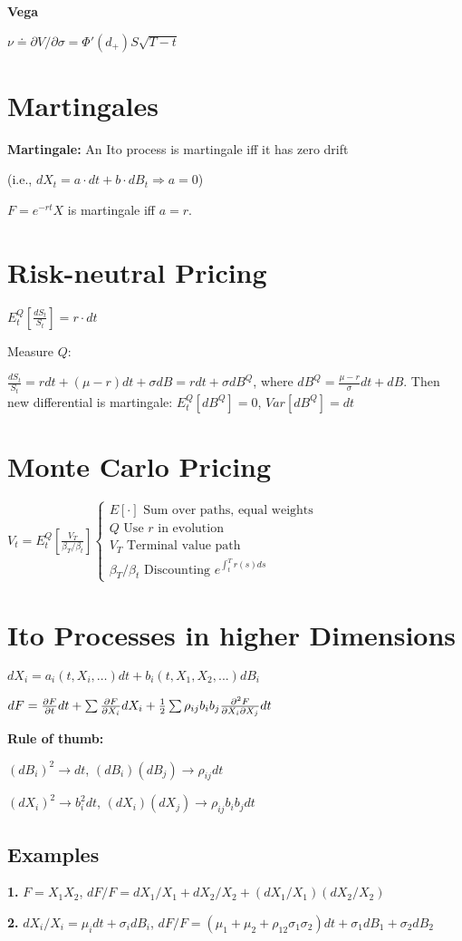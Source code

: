 \textbf{Vega}

$\nu \doteq \partial V / \partial \sigma = \Phi'(d_+)S\sqrt{T-t}$

\section{Martingales}

\textbf{Martingale:} An Ito process is martingale iff it has zero drift 

(i.e., $dX_t = a\cdot dt + b \cdot dB_t \Rightarrow a=0$)

$F = e^{-rt}X$ is martingale iff $a = r$.

\section{Risk-neutral Pricing}
$E^Q_t[\frac{dS_t}{S_t}] = r\cdot dt$

Measure $Q$:

$\frac{dS_t}{S_t} = rdt + (\mu - r)dt + \sigma dB = rdt + \sigma dB^Q$, where $dB^Q = \frac{\mu -r}{\sigma}dt + dB$. Then new differential is martingale:
$E^Q_t[dB^Q] = 0$, $Var[dB^Q] = dt$

\section{Monte Carlo Pricing}

$V_t = E^Q_t[\frac{V_T}{\beta_T/\beta_t}] \begin{cases}
    E[\cdot] \text{ Sum over paths, equal weights} \\
    Q \text{ Use } r \text{ in evolution}\\
    V_T \text{ Terminal value path}\\
    \beta_T/\beta_t \text{ Discounting } e^{\int_t^T r(s)ds}
\end{cases}$


\section{Ito Processes in higher Dimensions}

$dX_i = a_i(t, X_i, \ldots)dt + b_i(t, X_1, X_2, ...)dB_i $

$dF = \\ \frac{\partial F}{\partial t}dt + \sum \frac{\partial F}{\partial X_i}dX_i + \frac{1}{2}\sum \rho_{ij}b_ib_j\frac{\partial^2 F}{\partial X_i \partial X_j}dt$

\textbf{Rule of thumb:}

$(dB_i)^2 \to dt$, $(dB_i)(dB_j) \to \rho_{ij}dt$

$(dX_i)^2 \to b_i^2 dt$, $(dX_i)(dX_j) \to \rho_{ij}b_ib_j dt$

\subsection{Examples}

\textbf{1.} $F=X_1X_2$, $dF/F = dX_1/X_1 + dX_2/X_2 + (dX_1/X_1)(dX_2/X_2)$

\textbf{2.} $dX_i/X_i = \mu_i dt + \sigma_i dB_i$, $dF/F = (\mu_1 + \mu_2 + \rho_{12}\sigma_1\sigma_2)dt + \sigma_1 dB_1 + \sigma_2 dB_2$

